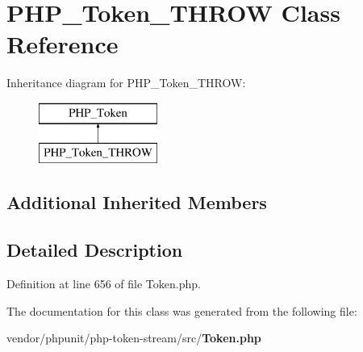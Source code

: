 \section{P\+H\+P\+\_\+\+Token\+\_\+\+T\+H\+R\+O\+W Class Reference}
\label{class_p_h_p___token___t_h_r_o_w}
Inheritance diagram for P\+H\+P\+\_\+\+Token\+\_\+\+T\+H\+R\+O\+W\+:\begin{figure}[H]
\begin{center}
\leavevmode
\includegraphics[height=2.000000cm]{class_p_h_p___token___t_h_r_o_w}
\end{center}
\end{figure}
\subsection*{Additional Inherited Members}


\subsection{Detailed Description}


Definition at line 656 of file Token.\+php.



The documentation for this class was generated from the following file\+:\begin{DoxyCompactItemize}
\item 
vendor/phpunit/php-\/token-\/stream/src/{\bf Token.\+php}\end{DoxyCompactItemize}
